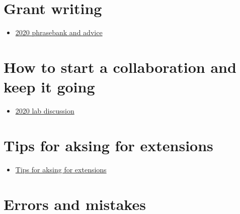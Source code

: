 \documentclass[
  letterpaper,
  DIV=11,
  numbers=noendperiod]{scrreprt}
\providecommand{\tightlist}{%
  \setlength{\itemsep}{0pt}\setlength{\parskip}{0pt}}\usepackage{longtable,booktabs,array}
\begin{document}
\hypertarget{grant-writing}{%
\section*{\texorpdfstring{\textbf{Grant
writing}}{Grant writing}}\label{grant-writing}}

\begin{itemize}
\tightlist
\item
  \href{https://docs.google.com/document/d/10TXWztCiID1-wNTGZ37rvYoIVHbf2kWmQMHoqN6pHQk/edit?pli=1}{2020
  phrasebank and advice}
\end{itemize}

\hypertarget{how-to-start-a-collaboration-and-keep-it-going}{%
\section*{\texorpdfstring{\textbf{How to start a collaboration and keep
it
going}}{How to start a collaboration and keep it going}}\label{how-to-start-a-collaboration-and-keep-it-going}}

\begin{itemize}
\tightlist
\item
  \href{https://docs.google.com/document/d/1mgWle41KPHnlCevE5IB9S1AaWQcYDFm_7riQU7WTfOM/edit}{2020
  lab discussion}
\end{itemize}

\hypertarget{tips-for-aksing-for-extensions}{%
\section*{\texorpdfstring{\textbf{Tips for aksing for
extensions}}{Tips for aksing for extensions}}\label{tips-for-aksing-for-extensions}}

\begin{itemize}
\tightlist
\item
  \href{https://docs.google.com/document/d/1o87Ua79CeVIQstDpy9m9DtGsZTL9ttFmVB-Kqus1Iig/edit}{Tips
  for aksing for extensions}
\end{itemize}

\hypertarget{errors-and-mistakes}{%
\section*{\texorpdfstring{\textbf{Errors and
mistakes}}{Errors and mistakes}}\label{errors-and-mistakes}}
\end{document}
